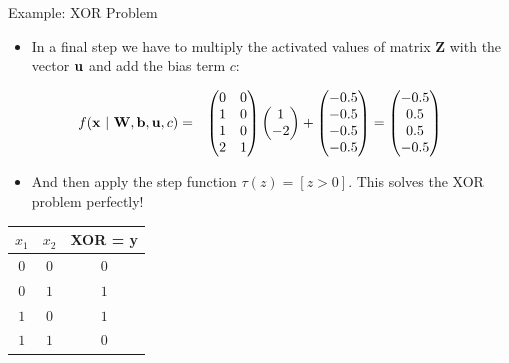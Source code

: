 \documentclass[11pt,compress,t,notes=noshow, xcolor=table]{beamer}
\begin{document}
\begin{vbframe}{Example: XOR Problem}
{\framebreak
  \begin{itemize}
    \item In a final step we have to multiply the activated values of matrix $\bm{Z}$ with the vector $\mathbf{u}$ and add the bias term $c$:
  \end{itemize}
  \begin{eqnarray*}
    f(\mathbf{x} ~|~ \mathbf{W}, \mathbf{b}, \mathbf{u}, c) &=&
    \begin{pmatrix}
      0 & 0 \\
      1 & 0 \\
      1 & 0 \\
      2 & 1
    \end{pmatrix}
    \begin{pmatrix}
      1 \\
      -2
    \end{pmatrix} + 
    \begin{pmatrix}
      - 0.5 \\
      - 0.5 \\
      - 0.5 \\
      - 0.5
    \end{pmatrix}
    =
    \begin{pmatrix}
      - 0.5 \\
      0.5 \\
      0.5 \\
      - 0.5
    \end{pmatrix}
  \end{eqnarray*}
  \begin{itemize}
    \item And then apply the step function $\tau(z) = [z > 0 ]$.  This solves the XOR problem perfectly!
  \end{itemize}
  \begin{table}
    \centering
      \begin{tabular}{ccc}
        \textbf{$x_1$}  & \textbf{$x_2$}  & \textbf{XOR} = y\\
        \hline
        \hline
        $0$             &   $0$           &  $0$ \\
        $0$             &   $1$           &  $1$ \\
        $1$             &   $0$           &  $1$ \\
        $1$             &   $1$           &  $0$
      \end{tabular}
  \end{table}
  }
\end{vbframe}
\end{document}
